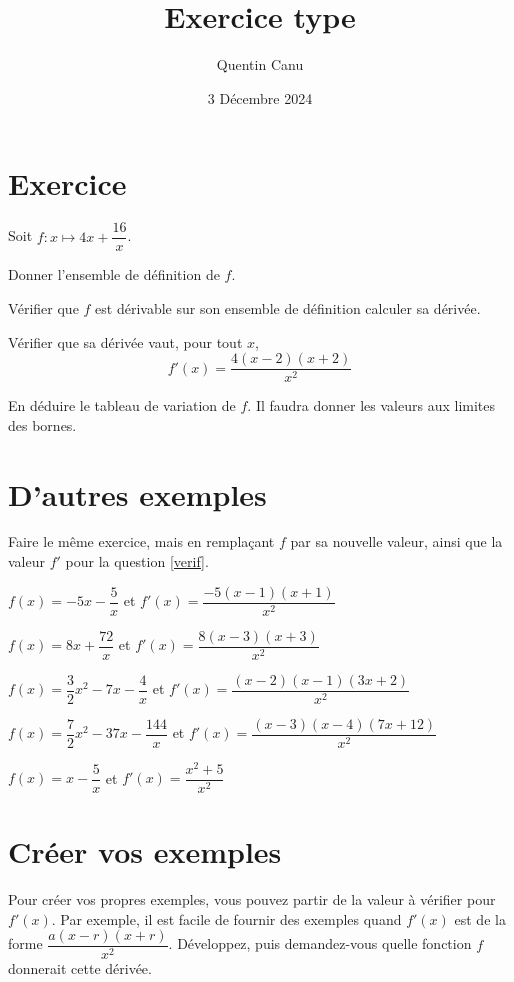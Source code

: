 \documentclass{article}
\title{Exercice type}
\date{3 Décembre 2024}
\author{Quentin Canu}
\begin{document}
\maketitle

\section{Exercice}

Soit $f \colon x \mapsto 4x + \dfrac{16}{x}$.

\begin{enumquestions}
\item Donner l'ensemble de définition de $f$.
\item Vérifier que $f$ est dérivable sur son ensemble de définition calculer sa dérivée.
\item \label{verif} Vérifier que sa dérivée vaut, pour tout $x$,
\begin{equation*}
f'(x) = \dfrac{4(x-2)(x+2)}{x^2}
\end{equation*}
\item En déduire le tableau de variation de $f$. Il faudra donner les valeurs aux limites des bornes.
\end{enumquestions}

\section{D'autres exemples}

Faire le même exercice, mais en remplaçant $f$ par sa nouvelle valeur, ainsi que la valeur $f'$ pour la question \ref{verif}.

\begin{enumquestions}
\item $f(x) = -5x - \dfrac{5}{x}$ et $f'(x) = \dfrac{-5(x-1)(x+1)}{x^2}$
\item $f(x) = 8x + \dfrac{72}{x} $ et $f'(x) = \dfrac{8(x-3)(x+3)}{x^2}$
\item $f(x) = \dfrac{3}{2}x^2 - 7x - \dfrac{4}{x}$ et $f'(x) = \dfrac{(x-2)(x-1)(3x+2)}{x^2}$
\item $f(x) = \dfrac{7}{2}x^2 - 37x - \dfrac{144}{x}$ et $f'(x) = \dfrac{(x-3)(x-4)(7x+12)}{x^2}$
\item $f(x) = x - \dfrac{5}{x}$ et $f'(x) = \dfrac{x^2 + 5}{x^2}$
\end{enumquestions}

\section{Créer vos exemples}

Pour créer vos propres exemples, vous pouvez partir de la valeur à vérifier pour $f'(x)$. Par exemple, il est facile de fournir des exemples quand $f'(x)$ est de la forme $\dfrac{a(x-r)(x+r)}{x^2}$. Développez, puis demandez-vous quelle fonction $f$ donnerait cette dérivée.
\end{document}
